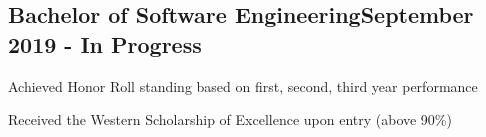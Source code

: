 
\vspace*{6pt}
\subsection{{Bachelor of Software Engineering}\hfill September 2019 - In Progress}
\vspace*{5pt}
\begin{zitemize}
\item Achieved Honor Roll standing based on first, second, third year performance
\item Received the Western Scholarship of Excellence upon entry (above 90\%)
\end{zitemize}